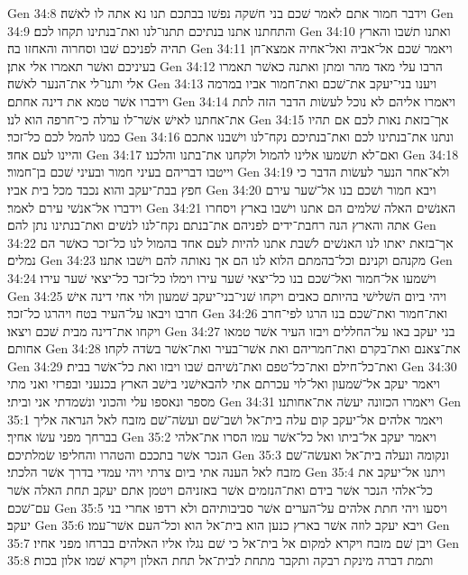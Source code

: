 Gen 34:8  וידבר חמור אתם לאמר שׁכם בני חשׁקה נפשׁו בבתכם תנו נא אתה לו לאשׁה׃
Gen 34:9  והתחתנו אתנו בנתיכם תתנו־לנו ואת־בנתינו תקחו לכם׃
Gen 34:10  ואתנו תשׁבו והארץ תהיה לפניכם שׁבו וסחרוה והאחזו בה׃
Gen 34:11  ויאמר שׁכם אל־אביה ואל־אחיה אמצא־חן בעיניכם ואשׁר תאמרו אלי אתן׃
Gen 34:12  הרבו עלי מאד מהר ומתן ואתנה כאשׁר תאמרו אלי ותנו־לי את־הנער לאשׁה׃
Gen 34:13  ויענו בני־יעקב את־שׁכם ואת־חמור אביו במרמה וידברו אשׁר טמא את דינה אחתם׃
Gen 34:14  ויאמרו אליהם לא נוכל לעשׂות הדבר הזה לתת את־אחתנו לאישׁ אשׁר־לו ערלה כי־חרפה הוא לנו׃
Gen 34:15  אך־בזאת נאות לכם אם תהיו כמנו להמל לכם כל־זכר׃
Gen 34:16  ונתנו את־בנתינו לכם ואת־בנתיכם נקח־לנו וישׁבנו אתכם והיינו לעם אחד׃
Gen 34:17  ואם־לא תשׁמעו אלינו להמול ולקחנו את־בתנו והלכנו׃
Gen 34:18  וייטבו דבריהם בעיני חמור ובעיני שׁכם בן־חמור׃
Gen 34:19  ולא־אחר הנער לעשׂות הדבר כי חפץ בבת־יעקב והוא נכבד מכל בית אביו׃
Gen 34:20  ויבא חמור ושׁכם בנו אל־שׁער עירם וידברו אל־אנשׁי עירם לאמר׃
Gen 34:21  האנשׁים האלה שׁלמים הם אתנו וישׁבו בארץ ויסחרו אתה והארץ הנה רחבת־ידים לפניהם את־בנתם נקח־לנו לנשׁים ואת־בנתינו נתן להם׃
Gen 34:22  אך־בזאת יאתו לנו האנשׁים לשׁבת אתנו להיות לעם אחד בהמול לנו כל־זכר כאשׁר הם נמלים׃
Gen 34:23  מקנהם וקנינם וכל־בהמתם הלוא לנו הם אך נאותה להם וישׁבו אתנו׃
Gen 34:24  וישׁמעו אל־חמור ואל־שׁכם בנו כל־יצאי שׁער עירו וימלו כל־זכר כל־יצאי שׁער עירו׃
Gen 34:25  ויהי ביום השׁלישׁי בהיותם כאבים ויקחו שׁני־בני־יעקב שׁמעון ולוי אחי דינה אישׁ חרבו ויבאו על־העיר בטח ויהרגו כל־זכר׃
Gen 34:26  ואת־חמור ואת־שׁכם בנו הרגו לפי־חרב ויקחו את־דינה מבית שׁכם ויצאו׃
Gen 34:27  בני יעקב באו על־החללים ויבזו העיר אשׁר טמאו אחותם׃
Gen 34:28  את־צאנם ואת־בקרם ואת־חמריהם ואת אשׁר־בעיר ואת־אשׁר בשׂדה לקחו׃
Gen 34:29  ואת־כל־חילם ואת־כל־טפם ואת־נשׁיהם שׁבו ויבזו ואת כל־אשׁר בבית׃
Gen 34:30  ויאמר יעקב אל־שׁמעון ואל־לוי עכרתם אתי להבאישׁני בישׁב הארץ בכנעני ובפרזי ואני מתי מספר ונאספו עלי והכוני ונשׁמדתי אני וביתי׃
Gen 34:31  ויאמרו הכזונה יעשׂה את־אחותנו׃
Gen 35:1  ויאמר אלהים אל־יעקב קום עלה בית־אל ושׁב־שׁם ועשׂה־שׁם מזבח לאל הנראה אליך בברחך מפני עשׂו אחיך׃
Gen 35:2  ויאמר יעקב אל־ביתו ואל כל־אשׁר עמו הסרו את־אלהי הנכר אשׁר בתככם והטהרו והחליפו שׂמלתיכם׃
Gen 35:3  ונקומה ונעלה בית־אל ואעשׂה־שׁם מזבח לאל הענה אתי ביום צרתי ויהי עמדי בדרך אשׁר הלכתי׃
Gen 35:4  ויתנו אל־יעקב את כל־אלהי הנכר אשׁר בידם ואת־הנזמים אשׁר באזניהם ויטמן אתם יעקב תחת האלה אשׁר עם־שׁכם׃
Gen 35:5  ויסעו ויהי חתת אלהים על־הערים אשׁר סביבותיהם ולא רדפו אחרי בני יעקב׃
Gen 35:6  ויבא יעקב לוזה אשׁר בארץ כנען הוא בית־אל הוא וכל־העם אשׁר־עמו׃
Gen 35:7  ויבן שׁם מזבח ויקרא למקום אל בית־אל כי שׁם נגלו אליו האלהים בברחו מפני אחיו׃
Gen 35:8  ותמת דברה מינקת רבקה ותקבר מתחת לבית־אל תחת האלון ויקרא שׁמו אלון בכות׃
